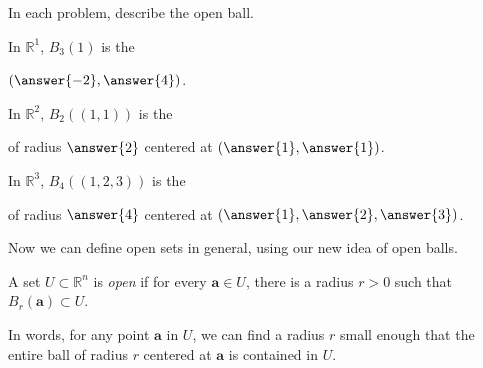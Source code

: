 \documentclass{ximera}
\begin{document}
In each problem, describe the open ball.

\begin{problem}
In $\mathbb{R}^1$, $B_3(1)$ is the \begin{multipleChoice}
\end{multipleChoice}  \begin{problem}$(\answer{-2},\answer{4})$.\end{problem}
\end{problem} 
 
 \begin{problem}
 In $\mathbb{R}^2$, $B_2((1,1))$ is the \begin{multipleChoice}
\end{multipleChoice} \begin{problem}of radius $\answer{2}$ centered at $(\answer{1}, \answer{1})$.\end{problem}
\end{problem}

\begin{problem}
In $\mathbb{R}^3$, $B_4((1,2,3))$ is the \begin{multipleChoice}
\end{multipleChoice} \begin{problem} of radius $\answer{4}$ centered at $(\answer{1}, \answer{2}, \answer{3})$.\end{problem}
\end{problem}


Now we can define open sets in general, using our new idea of open balls.

\begin{definition}
A set $U\subset \mathbb{R}^n$ is \emph{open} if for every $\mathbf{a}\in U$, there is a radius $r>0$ such that $B_r(\mathbf{a})\subset U$.
\end{definition}

In words, for any point $\mathbf{a}$ in $U$, we can find a radius $r$ small enough that the entire ball of radius $r$ centered at $\mathbf{a}$ is contained in $U$.

\end{document}

